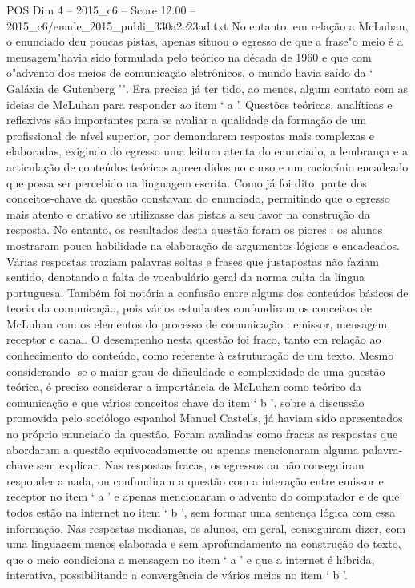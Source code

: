 \begin{textsample}{POS Dim 4 – 2015\_c6 – Score 12.00 – 2015\_c6/enade\_2015\_publi\_330a2c23ad.txt}
No entanto, em relação a McLuhan, o enunciado deu poucas pistas, apenas situou o egresso de que a frase"o meio é a mensagem"havia sido formulada pelo teórico na década de 1960 e que com o"advento dos meios de comunicação eletrônicos, o mundo havia saído da ‘ Galáxia de Gutenberg ’".
Era preciso já ter tido, ao menos, algum contato com as ideias de McLuhan para responder ao item ‘ a ’.
Questões teóricas, analíticas e reflexivas são importantes para se avaliar a qualidade da formação de um profissional de nível superior, por demandarem respostas mais complexas e elaboradas, exigindo do egresso uma leitura atenta do enunciado, a lembrança e a articulação de conteúdos teóricos apreendidos no curso e um raciocínio encadeado que possa ser percebido na linguagem escrita.
Como já foi dito, parte dos conceitos-chave da questão constavam do enunciado, permitindo que o egresso mais atento e criativo se utilizasse das pistas a seu favor na construção da resposta.
No entanto, os resultados desta questão foram os piores : os alunos mostraram pouca habilidade na elaboração de argumentos lógicos e encadeados.
Várias respostas traziam palavras soltas e frases que justapostas não faziam sentido, denotando a falta de vocabulário geral da norma culta da língua portuguesa.
Também foi notória a confusão entre alguns dos conteúdos básicos de teoria da comunicação, pois vários estudantes confundiram os conceitos de McLuhan com os elementos do processo de comunicação : emissor, mensagem, receptor e canal.
O desempenho nesta questão foi fraco, tanto em relação ao conhecimento do conteúdo, como referente à estruturação de um texto.
Mesmo considerando -se o maior grau de dificuldade e complexidade de uma questão teórica, é preciso considerar a importância de McLuhan como teórico da comunicação e que vários conceitos chave do item ‘ b ’, sobre a discussão promovida pelo sociólogo espanhol Manuel Castells, já haviam sido apresentados no próprio enunciado da questão.
Foram avaliadas como fracas as respostas que abordaram a questão equivocadamente ou apenas mencionaram alguma palavra-chave sem explicar.
Nas respostas fracas, os egressos ou não conseguiram responder a nada, ou confundiram a questão com a interação entre emissor e receptor no item ‘ a ’ e apenas mencionaram o advento do computador e de que todos estão na internet no item ‘ b ’, sem formar uma sentença lógica com essa informação.
Nas respostas medianas, os alunos, em geral, conseguiram dizer, com uma linguagem menos elaborada e sem aprofundamento na construção do texto, que o meio condiciona a mensagem no item ‘ a ’ e que a internet é híbrida, interativa, possibilitando a convergência de vários meios no item ‘ b ’.

\end{textsample}
